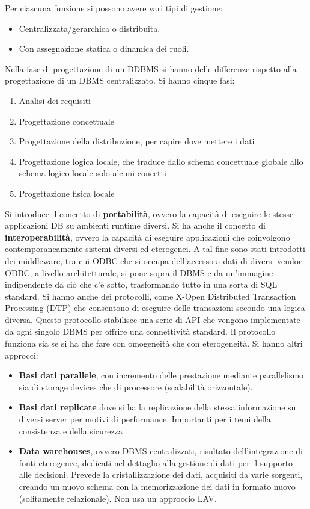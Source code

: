 Per ciascuna funzione si possono avere vari tipi di gestione:
\begin{itemize}
    \item Centralizzata/gerarchica o distribuita.
    \item Con assegnazione statica o dinamica dei ruoli.
\end{itemize}
Nella fase di progettazione di un DDBMS si hanno delle differenze rispetto alla
progettazione di un DBMS centralizzato. Si hanno cinque fasi:
\begin{enumerate}
    \item Analisi dei requisiti
    \item Progettazione concettuale
    \item Progettazione della distribuzione, per capire dove mettere i dati
    \item Progettazione logica locale, che traduce dallo schema concettuale
          globale allo schema logico locale solo alcuni concetti
    \item Progettazione fisica locale
\end{enumerate}
Si introduce il concetto di \textbf{portabilità}, ovvero la capacità di eseguire
le stesse applicazioni DB su ambienti runtime diversi. Si ha anche il concetto
di \textbf{interoperabilità}, ovvero la capacità di eseguire applicazioni che
coinvolgono contemporaneamente sistemi diversi ed eterogenei. A tal fine sono
stati introdotti dei middleware, tra cui ODBC che si occupa dell'accesso a dati
di diversi vendor. ODBC, a livello architetturale, si pone sopra il DBMS e da
un'immagine indipendente da ciò che c'è sotto, trasformando tutto in una sorta
di SQL standard. Si hanno anche dei protocolli, come X-Open Distributed
Transaction Processing (DTP) che consentono di eseguire delle transazioni secondo
una logica diversa. Questo protocollo stabilisce una serie di API che vengono
implementate da ogni singolo DBMS per offrire una connettività standard.
Il protocollo funziona sia se si ha che fare con omogeneità che con eterogeneità.
Si hanno altri approcci:
\begin{itemize}
    \item \textbf{Basi dati parallele}, con incremento delle prestazione
          mediante parallelismo sia di storage devices che di processore
          (scalabilità orizzontale).
    \item \textbf{Basi dati replicate} dove si ha la replicazione della stessa
          informazione su diversi server per motivi di performance. Importanti
          per i temi della consistenza e della sicurezza
    \item \textbf{Data warehouses}, ovvero DBMS centralizzati, risultato
          dell'integrazione di fonti eterogenee, dedicati nel dettaglio alla
          gestione di dati per il supporto alle decisioni. Prevede la
          cristallizzazione dei dati, acquisiti da varie sorgenti, creando un
          nuovo schema con la memorizzazione dei dati in formato nuovo
          (solitamente relazionale). Non usa un approccio LAV.
\end{itemize}

